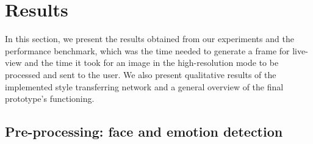 \section{Results}

In this section, we present the results obtained from our experiments and the performance benchmark, which was the time needed to generate a frame for live-view and the time it took for an image in the high-resolution mode to be processed and sent to the user. We also present qualitative results of the implemented style transferring network and a general overview of the final prototype's functioning.

\subsection{Pre-processing: face and emotion detection}


